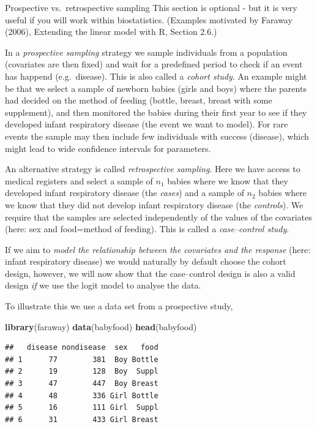 \documentclass[
  ignorenonframetext,
]{beamer}
\newenvironment{Shaded}{\begin{snugshade}}{\end{snugshade}}
\newcommand{\FunctionTok}[1]{\textcolor[rgb]{0.13,0.29,0.53}{\textbf{#1}}}
\newcommand{\NormalTok}[1]{#1}
\begin{document}
\begin{frame}[fragile]{Prospective vs.~retrospective sampling}
\protect\hypertarget{prospective-vs.-retrospective-sampling}{}
This section is optional - but it is very useful if you will work within
biostatistics. (Examples motivated by Faraway (2006), Extending the
linear model with R, Section 2.6.)

In a \emph{prospective sampling} strategy we sample individuals from a
population (covariates are then fixed) and wait for a predefined period
to check if an event has happend (e.g.~disease). This is also called a
\emph{cohort study}. An example might be that we select a sample of
newborn babies (girls and boys) where the parents had decided on the
method of feeding (bottle, breast, breast with some supplement), and
then monitored the babies during their first year to see if they
developed infant respiratory disease (the event we want to model). For
rare events the sample may then include few individuals with success
(disease), which might lead to wide confidence intervals for parameters.

An alternative strategy is called \emph{retrospective sampling}. Here we
have access to medical registers and select a sample of \(n_1\) babies
where we know that they developed infant respiratory disease (the
\emph{cases}) and a sample of \(n_2\) babies where we know that they did
not develop infant respiratory disease (the \emph{controls}). We require
that the samples are selected independently of the values of the
covariates (here: sex and food=method of feeding). This is called a
\emph{case--control study}.

If we aim to \emph{model the relationship between the covariates and the
response} (here: infant respiratory disease) we would naturally by
default choose the cohort design, however, we will now show that the
case--control design is also a valid design \emph{if} we use the logit
model to analyse the data.

To illustrate this we use a data set from a prospective study,

\begin{Shaded}
\begin{Highlighting}[]
\FunctionTok{library}\NormalTok{(faraway)}
\FunctionTok{data}\NormalTok{(babyfood)}
\FunctionTok{head}\NormalTok{(babyfood)}
\end{Highlighting}
\end{Shaded}

\begin{verbatim}
##   disease nondisease  sex   food
## 1      77        381  Boy Bottle
## 2      19        128  Boy  Suppl
## 3      47        447  Boy Breast
## 4      48        336 Girl Bottle
## 5      16        111 Girl  Suppl
## 6      31        433 Girl Breast
\end{verbatim}


\end{frame}
\end{document}
